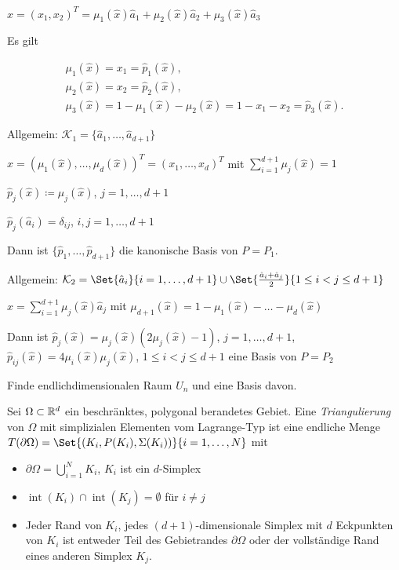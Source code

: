 \documentclass{cheat-sheet}
\newcommand{\bOmega}{\partial \Omega} %
\DeclareMathOperator{\inte}{int} %
\begin{document}


$\hat{x} = (x_1, x_2)^T = \mu_1(\hat{x}) \hat{a}_1 + \mu_2(\hat{x}) \hat{a}_2 + \mu_3(\hat{x}) \hat{a}_3$

Es gilt

\begin{align*}
  \mu_1(\hat{x}) = x_1 = \hat{p}_1(\hat{x}), \\
  \mu_2(\hat{x}) = x_2 = \hat{p}_2(\hat{x}), \\
  \mu_3(\hat{x}) = 1 - \mu_1(\hat{x}) - \mu_2(\hat{x}) = 1 - x_1 - x_2 = \hat{p}_3(\hat{x}).
\end{align*}

Allgemein: $\mathcal{K}_1 = \{ \hat{a}_1, \ldots, \hat{a}_{d+1} \}$

$\hat{x} = (\mu_1(\hat{x}), \ldots, \mu_d(\hat{x}))^T = (x_1, \ldots, x_d)^T$ mit $\sum_{i=1}^{d+1} \mu_j(\hat{x}) = 1$

$\hat{p}_j(\hat{x}) \coloneqq \mu_j(\hat{x})$, $j = 1, \ldots, d+1$

$\hat{p}_j(\hat{a}_i) = \delta_{ij}$, $i, j = 1, \ldots, d+1$

Dann ist $\{ \hat{p}_1, \ldots, \hat{p}_{d+1} \}$ die kanonische Basis von $P = P_1$.

Allgemein: $\mathcal{K}_2 = \Set{\hat{a}_i}{i = 1, \ldots, d+1} \cup \Set{\tfrac{\hat{a}_i + \hat{a}_j}{2}}{1 \leq i < j \leq d+1}$

$\hat{x} = \sum_{i=1}^{d+1} \mu_j(\hat{x}) \hat{a}_j$ mit $\mu_{d+1}(\hat{x}) = 1 - \mu_1(\hat{x}) - \ldots - \mu_d(\hat{x})$

Dann ist
$\hat{p}_j(\hat{x}) = \mu_j(\hat{x}) (2 \mu_j(\hat{x}) - 1)$, $j = 1, \ldots, d+1$,
$\hat{p}_{ij}(\hat{x}) = 4 \mu_i(\hat{x}) \mu_j(\hat{x})$, $1 \leq i < j \leq d+1$
eine Basis von $P = P_2$


\begin{ziel}
  Finde endlichdimensionalen Raum $U_n$ und eine Basis davon.
\end{ziel}

\begin{defn}
  Sei $\Omega \subset \mathbb{R}^d$ ein beschränktes, polygonal berandetes Gebiet.
  Eine \emph{Triangulierung} von $\Omega$ mit simplizialen Elementen vom Lagrange-Typ ist eine endliche Menge $T(\bOmega) = \Set{(K_i, P(K_i), \Sigma(K_i))}{i = 1, \ldots, N}$ mit
  \begin{itemize}
    \item $\bOmega = \bigcup_{i=1}^N K_i$, $K_i$ ist ein $d$-Simplex
    \item $\inte(K_i) \cap \inte(K_j) = \emptyset$ für $i \neq j$
    \item Jeder Rand von $K_i$, \dh{} jedes $(d+1)$-dimensionale Simplex mit $d$ Eckpunkten von $K_i$ ist entweder Teil des Gebietrandes $\partial \Omega$ oder der vollständige Rand eines anderen Simplex $K_j$.
  \end{itemize}
\end{defn}
\end{document}
